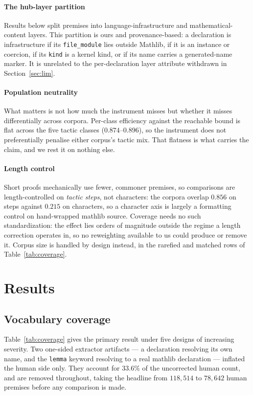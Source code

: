\documentclass{article}
\begin{document}
\paragraph{The hub-layer partition}
Results below split premises into language-infrastructure and
mathematical-content layers. This partition is ours and provenance-based: a
declaration is infrastructure if its \texttt{file\_module} lies outside Mathlib,
if it is an instance or coercion, if its \texttt{kind} is a kernel kind, or if
its name carries a generated-name marker. It is unrelated to the per-declaration
layer attribute withdrawn in Section~\ref{sec:lim}.

\paragraph{Population neutrality}
What matters is not how much the instrument misses but whether it misses
differentially across corpora. Per-class efficiency against the reachable bound
is flat across the five tactic classes ($0.874$--$0.896$), so the instrument does
not preferentially penalise either corpus's tactic mix. That flatness is what
carries the claim, and we rest it on nothing else.

\paragraph{Length control}
Short proofs mechanically use fewer, commoner premises, so comparisons are
length-controlled on \emph{tactic steps}, not characters: the corpora overlap
$0.856$ on steps against $0.215$ on characters, so a character axis is largely a
formatting control on hand-wrapped mathlib source. Coverage needs no such
standardization: the effect lies orders of magnitude outside the regime a length
correction operates in, so no reweighting available to us could produce or
remove it. Corpus size is handled by design instead, in the rarefied and matched
rows of Table~\ref{tab:coverage}.

\section{Results}\label{res}

\subsection{Vocabulary coverage}

Table~\ref{tab:coverage} gives the primary result under five designs of
increasing severity. Two one-sided extractor artifacts --- a declaration
resolving its own name, and the \texttt{lemma} keyword resolving to a real
mathlib declaration --- inflated the human side only. They account for
$33.6\%$ of the uncorrected human count, and are removed throughout, taking the headline from $118{,}514$ to $78{,}642$ human
premises before any comparison is made.
\end{document}
